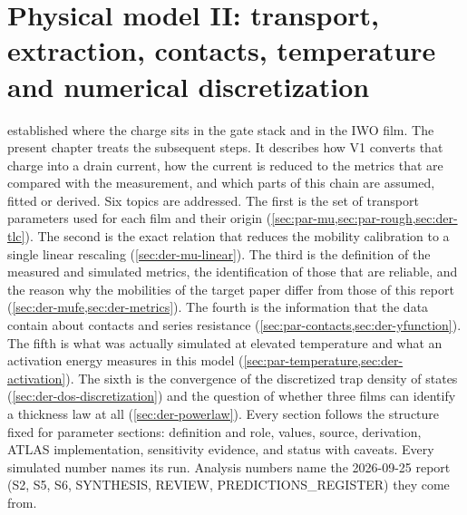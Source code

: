 \chapter{Physical model II: transport, extraction, contacts, temperature and numerical discretization}\label{ch:derivations-tr}

 established where the charge sits in the gate stack and in the IWO film. The present chapter treats the subsequent steps. It describes how V1 converts that charge into a drain current, how the current is reduced to the metrics that are compared with the measurement, and which parts of this chain are assumed, fitted or derived. Six topics are addressed. The first is the set of transport parameters used for each film and their origin (\cref{sec:par-mu,sec:par-rough,sec:der-tlc}). The second is the exact relation that reduces the mobility calibration to a single linear rescaling (\cref{sec:der-mu-linear}). The third is the definition of the measured and simulated metrics, the identification of those that are reliable, and the reason why the mobilities of the target paper differ from those of this report (\cref{sec:der-mufe,sec:der-metrics}). The fourth is the information that the data contain about contacts and series resistance (\cref{sec:par-contacts,sec:der-yfunction}). The fifth is what was actually simulated at elevated temperature and what an activation energy measures in this model (\cref{sec:par-temperature,sec:der-activation}). The sixth is the convergence of the discretized trap density of states (\cref{sec:der-dos-discretization}) and the question of whether three films can identify a thickness law at all (\cref{sec:der-powerlaw}).
Every section follows the structure fixed for parameter sections: definition and role, values, source, derivation, ATLAS implementation, sensitivity evidence, and status with caveats. Every simulated number names its run. Analysis numbers name the 2026-09-25 report (S2, S5, S6, SYNTHESIS, REVIEW, PREDICTIONS\_REGISTER) they come from.


